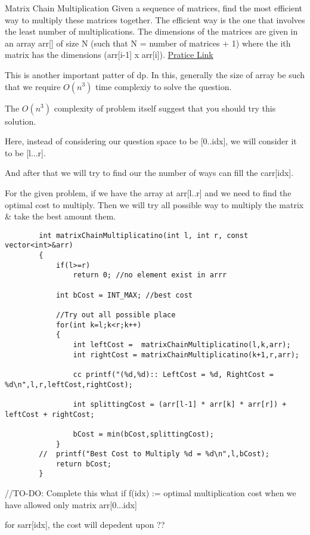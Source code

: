 \begin{problem}{Matrix Chain Multiplication}
    Given a sequence of matrices, find the most efficient way to multiply these matrices together. The efficient way is the one that involves the least number of multiplications.
    The dimensions of the matrices are given in an array arr[] of size N (such that N = number of matrices + 1) where the ith matrix has the dimensions (arr[i-1] x arr[i]).
    \href{https://practice.geeksforgeeks.org/problems/matrix-chain-multiplication0303/1}{Pratice Link}
\end{problem}

\begin{solution}
    This is another important patter of dp. 
    In this, generally the size of array be such that we require $O(n^3)$ time complexiy to solve the question.
    
   \begin{marginnote}
    The $O(n^3)$ complexity of problem itself suggest that you should try this solution.
   \end{marginnote}

   \vspace{2mm}
   Here, instead of considering our question space to be [0..idx], we will consider it to be [l...r].


   And after that we will try to find our the number of ways can fill the carr[idx].

   \vspace{2mm}
   For the given problem, if we have the array at arr[l..r] and we need to find the optimal cost to multiply.
   Then we will try all possible way to multiply the matrix \& take the best amount them.
   
   \begin{verbatim}
        int matrixChainMultiplicatino(int l, int r, const vector<int>&arr)
        {
            if(l>=r)
                return 0; //no element exist in arrr

            int bCost = INT_MAX; //best cost
            
            //Try out all possible place
            for(int k=l;k<r;k++)
            {
                int leftCost =  matrixChainMultiplicatino(l,k,arr);
                int rightCost = matrixChainMultiplicatino(k+1,r,arr);

                cc printf("(%d,%d):: LeftCost = %d, RightCost = %d\n",l,r,leftCost,rightCost);

                int splittingCost = (arr[l-1] * arr[k] * arr[r]) + leftCost + rightCost;

                bCost = min(bCost,splittingCost);
            }
        //  printf("Best Cost to Multiply %d = %d\n",l,bCost);
            return bCost;
        }
   \end{verbatim}

\end{solution}

\begin{solution}
    //TO-DO: Complete this
    what if f(idx) := optimal multiplication cost when we have allowed only matrix arr[0...idx]

    for sarr[idx], the cost will depedent upon ??
\end{solution}
    